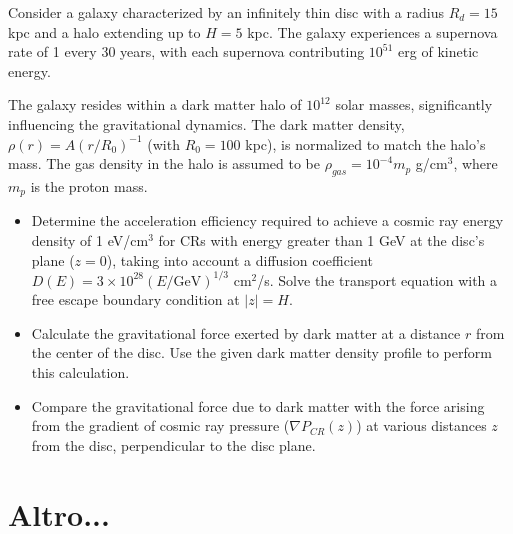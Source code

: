 Consider a galaxy characterized by an infinitely thin disc with a radius \(R_d = 15\) kpc and a halo extending up to \(H = 5\) kpc. The galaxy experiences a supernova rate of 1 every 30 years, with each supernova contributing \(10^{51}\) erg of kinetic energy. 

The galaxy resides within a dark matter halo of \(10^{12}\) solar masses, significantly influencing the gravitational dynamics. The dark matter density, \(\rho(r) = A(r/R_0)^{-1}\) (with \(R_0 = 100\) kpc), is normalized to match the halo's mass. The gas density in the halo is assumed to be \(\rho_{gas} = 10^{-4} m_p\) g/cm\(^3\), where \(m_p\) is the proton mass.

\begin{itemize}
\item Determine the acceleration efficiency required to achieve a cosmic ray energy density of 1 eV/cm\(^3\) for CRs with energy greater than 1 GeV at the disc's plane (\(z = 0\)), taking into account a diffusion coefficient \(D(E) = 3 \times 10^{28} (E / \text{GeV})^{1/3}\) cm\(^2\)/s. Solve the transport equation with a free escape boundary condition at \(|z| = H\). 
\item Calculate the gravitational force exerted by dark matter at a distance \(r\) from the center of the disc. Use the given dark matter density profile to perform this calculation.
\item Compare the gravitational force due to dark matter with the force arising from the gradient of cosmic ray pressure (\(\nabla P_{CR}(z)\)) at various distances \(z\) from the disc, perpendicular to the disc plane.
\end{itemize}

\section{Altro...}
